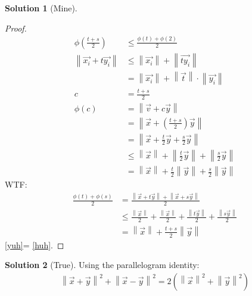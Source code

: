 \documentclass[12pt]{article}
\theoremstyle{definition} %
\newtheorem{solution}{Solution}
\theoremstyle{plain} %
\begin{document}
\begin{solution}[Mine]
\begin{proof}
       \begin{align}
    \phi\left( \frac{t+s}{2} \right) &\leq \frac{\phi(t)+\phi(2)}{2}\\[10pt] 
    \left\lVert \vec{x_i}+t \vec{y_i}  \right\rVert &\leq \left\lVert \vec{x_{i}}\right\rVert + \left\lVert \vec{ty_{i}}\right\rVert \\[10pt] 
    &= \left\lVert \vec{x_{i}}\right\rVert + \left\lVert \vec{t}\right\rVert \cdot\left\lVert \vec{y_{i}}\right\rVert \\[10pt] 
    c&= \frac{t+s}{2}\\[10pt] 
    \phi\left( c \right) &= \left\lVert \vec{v} +c \vec{y} \right\rVert \\[10pt] 
    &= \left\lVert \vec{x} + \left( \frac{t+s}{2} \right) \vec{y} \right\rVert \\[10pt] 
    &= \left\lVert \vec{x} +\frac{t}{2}\vec{y} +\frac{s}{2}\vec{y} \right\rVert \\[10pt] 
    &\leq \left\lVert \vec{x} \right\rVert + \left\lVert \frac{t}{2}\vec{y} \right\rVert + \left\lVert \frac{s}{2}\vec{y} \right\rVert \\[10pt] 
    &= \left\lVert \vec{x} \right\rVert + \frac{t}{2}\left\lVert \vec{y} \right\rVert + \frac{s}{2}\left\lVert \vec{y} \right\rVert \label{yuh}
   \end{align} 
   WTF: \begin{align}
    \frac{\phi(t)+\phi(s)}{2}&=\frac{\left\lVert \vec{x} +t\vec{y} \right\rVert + \left\lVert \vec{x} +s \vec{y} \right\rVert}{2} \\[10pt] 
    &\leq \frac{\left\lVert \vec{x} \right\rVert}{2}+\frac{\left\lVert \vec{x} \right\rVert}{2}+\frac{\left\lVert t \vec{y}  \right\rVert}{2} + \frac{\left\lVert s \vec{y}   \right\rVert}{2} \\[10pt] 
    &= \left\lVert \vec{x} \right\rVert + \frac{t+s}{2}\left\lVert \vec{y} \right\rVert \label{huh}
   \end{align}
   \autoref{yuh}= \autoref{huh}.
\end{proof}
\end{solution}
\begin{solution}[True]
   Using the parallelogram identity:
   \begin{align}
    \left\lVert \vec{x} +\vec{y} \right\rVert^{2}+\left\lVert \vec{x} -\vec{y} \right\rVert^{2}= 2\left( \left\lVert \vec{x} \right\rVert^{2}+\left\lVert \vec{y} \right\rVert^{2}   \right) 
   \end{align} 
\end{solution}
\end{document}

